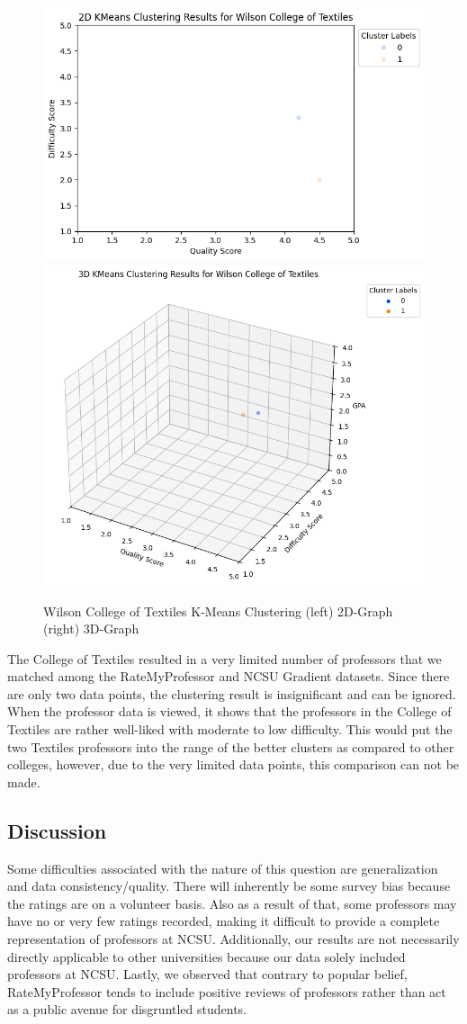 \documentclass[sigconf,nonacm]{acmart}
\begin{document}
\begin{figure}[H]
    \centering
    \includegraphics[width=0.45\linewidth]{images/textiles-2d.png}
    \includegraphics[width=0.45\linewidth]{images/textiles-3d.png}
    \caption{Wilson College of Textiles K-Means Clustering (left) 2D-Graph (right) 3D-Graph}
    \label{fig:enter-label}
\end{figure}

The College of Textiles resulted in a very limited number of professors that we matched among the RateMyProfessor and NCSU Gradient datasets. Since there are only two data points, the clustering result is insignificant and can be ignored. When the professor data is viewed, it shows that the professors in the College of Textiles are rather well-liked with moderate to low difficulty. This would put the two Textiles professors into the range of the better clusters as compared to other colleges, however, due to the very limited data points, this comparison can not be made.

\subsection{Discussion}

Some difficulties associated with the nature of this question are generalization and data consistency/quality. There will inherently be some survey bias because the ratings are on a volunteer basis. Also as a result of that, some professors may have no or very few ratings recorded, making it difficult to provide a complete representation of professors at NCSU. Additionally, our results are not necessarily directly applicable to other universities because our data solely included professors at NCSU. Lastly, we observed that contrary to popular belief, RateMyProfessor tends to include positive reviews of professors rather than act as a public avenue for disgruntled students.
\end{document}
